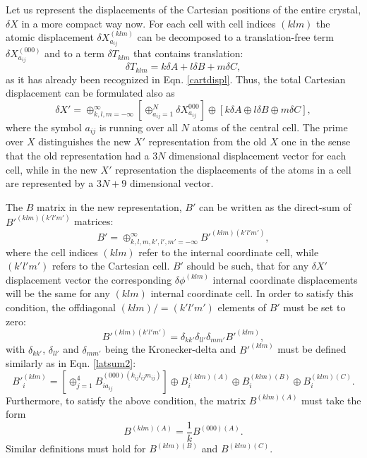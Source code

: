 \documentclass[prl,aps,preprint,superbib,12pt]{revtex4}
\begin{document}
Let us represent the displacements of the Cartesian
positions of the entire crystal, $\delta X$ in a more
compact way now. For each cell with cell indices
$(klm)$ the atomic displacement $\delta X^{(klm)}_{a_{ij}}$
can be decomposed to a translation-free term 
$\delta X^{(000)}_{a_{ij}}$ and to a term $\delta T_{klm}$ that
contains translation:
\begin{equation}
\delta T_{klm} = k \delta A + l \delta B + m \delta C ,
\end{equation}
as it has already been recognized in Eqn. \ref{cartdispl}.
Thus, the total Cartesian displacement can be formulated also as
\begin{equation} \label{newx}
\delta X' = 
\oplus_{k,l,m=-\infty}^{\infty}
\left[ \oplus_{a_{ij}=1}^{N} \delta X^{000}_{a_{ij}} \right]
\oplus
\left[ 
 k \delta A \oplus l \delta B \oplus m \delta C \right] ,
\end{equation}
where the symbol $a_{ij}$ is running over all $N$ atoms
of the central cell. The prime over $X$ distinguishes
the new $X'$ representation from the old $X$ one in the sense
that the old representation had a $3N$ dimensional displacement
vector for each cell, while in the new $X'$ representation
the displacements of the atoms in a cell are represented by
a $3N+9$ dimensional vector.

The $B$ matrix in the new representation, $B'$ can be written
as the direct-sum of $B'^{(klm)(k'l'm')}$ matrices:
\begin{equation}
B' = \oplus_{k,l,m,k',l',m'=-\infty}^{\infty} B'^{(klm)(k'l'm')} ,
\end{equation}
where the cell indices $(klm)$ refer to the internal coordinate
cell, while $(k'l'm')$ refers to the Cartesian cell.
$B'$ should be such, that for any $\delta X'$ displacement vector
the corresponding $\delta \phi^{(klm)}$ internal coordinate
displacements will be the same for any $(klm)$ internal coordinate
cell.
In order to satisfy this condition, the offdiagonal $(klm)/=(k'l'm')$
elements of $B'$ must be set to zero:
\begin{equation} \label{kronecker}
B'^{(klm)(k'l'm')} = \delta_{kk'} \delta_{ll'} \delta_{mm'} B'^{(klm)} ,
\end{equation}
with $\delta_{kk'}$, $\delta_{ll'}$ and $\delta_{mm'}$
being the Kronecker-delta and
$B'^{(klm)}$ must be defined similarly as in Eqn. \ref{latsum2}:
\begin{equation} \label{latsum4}
B'^{(klm)}_{i} =
[\oplus_{j=1}^{4}
B^{(000)(k_{ij}l_{ij}m_{ij})}_{ia_{ij}}
] \oplus B^{(klm)(A)}_{i} \oplus B^{(klm)(B)}_{i} 
\oplus B^{(klm)(C)}_{i} .
\end{equation}
Furthermore, to satisfy the above condition, 
the matrix $B^{(klm)(A)}$ must take the form
\begin{equation} \label{matba}
B^{(klm)(A)} = \frac{1}{k} B^{(000)(A)} .
\end{equation}
Similar definitions must hold for $B^{(klm)(B)}$ and
$B^{(klm)(C)}$. 
\end{document}
